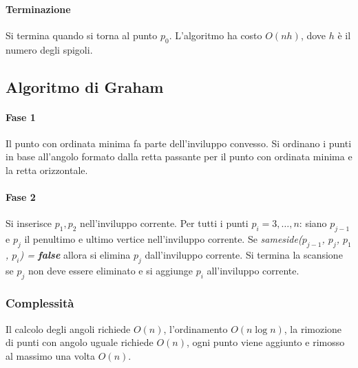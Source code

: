 \paragraph{Terminazione}
Si termina quando si torna al punto $p_0$. L'algoritmo ha costo $O(nh)$, dove $h$ \`e il numero degli spigoli.
\subsection{Algoritmo di Graham}
\paragraph{Fase 1}
Il punto con ordinata minima fa parte dell'inviluppo convesso. Si ordinano i punti in base all'angolo formato dalla retta passante per il punto con ordinata minima e la retta 
orizzontale.
\paragraph{Fase 2}
Si inserisce $p_1, p_2$ nell'inviluppo corrente. Per tutti i punti $p_i = 3, \dots, n$: siano $p_{j-1}$ e $p_j$ il penultimo e ultimo vertice nell'inviluppo corrente. Se 
\emph{sameside($p_{j-1}$, $p_j$, $p_1$, $p_i$) = \textbf{false}} allora si elimina $p_j$ dall'inviluppo corrente. Si termina la scansione se $p_j$ non deve essere eliminato e si
aggiunge $p_i$ all'inviluppo corrente.\\

\subsubsection{Complessit\`a}
Il calcolo degli angoli richiede $O(n)$, l'ordinamento $O(n\log n)$, la rimozione di punti con angolo uguale richiede $O(n)$, ogni punto viene aggiunto e rimosso al massimo una 
volta $O(n)$.
